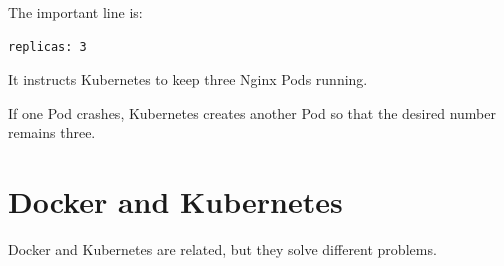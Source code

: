 \documentclass[a4paper]{article}
\begin{document}
        The important line is:
        
        \begin{verbatim}
replicas: 3
        \end{verbatim}
        
        It instructs Kubernetes to keep three Nginx Pods running.
        
        If one Pod crashes, Kubernetes creates another Pod so that the desired number
        remains three.
    
    
    \section{Docker and Kubernetes}
        
        Docker and Kubernetes are related, but they solve different problems.
        
\end{document}
